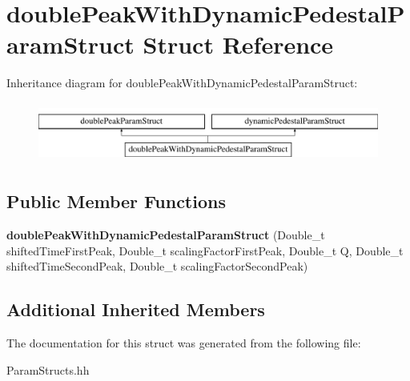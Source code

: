 \hypertarget{structdouble_peak_with_dynamic_pedestal_param_struct}{}\section{double\+Peak\+With\+Dynamic\+Pedestal\+Param\+Struct Struct Reference}
\label{structdouble_peak_with_dynamic_pedestal_param_struct}
Inheritance diagram for double\+Peak\+With\+Dynamic\+Pedestal\+Param\+Struct\+:\begin{figure}[H]
\begin{center}
\leavevmode
\includegraphics[height=2.000000cm]{structdouble_peak_with_dynamic_pedestal_param_struct}
\end{center}
\end{figure}
\subsection*{Public Member Functions}
\begin{DoxyCompactItemize}
\item 
\hypertarget{structdouble_peak_with_dynamic_pedestal_param_struct_abb78e48a8a4e432b051e411c058e6e36}{}{\bfseries double\+Peak\+With\+Dynamic\+Pedestal\+Param\+Struct} (Double\+\_\+t shifted\+Time\+First\+Peak, Double\+\_\+t scaling\+Factor\+First\+Peak, Double\+\_\+t Q, Double\+\_\+t shifted\+Time\+Second\+Peak, Double\+\_\+t scaling\+Factor\+Second\+Peak)\label{structdouble_peak_with_dynamic_pedestal_param_struct_abb78e48a8a4e432b051e411c058e6e36}

\end{DoxyCompactItemize}
\subsection*{Additional Inherited Members}


The documentation for this struct was generated from the following file\+:\begin{DoxyCompactItemize}
\item 
Param\+Structs.\+hh\end{DoxyCompactItemize}
